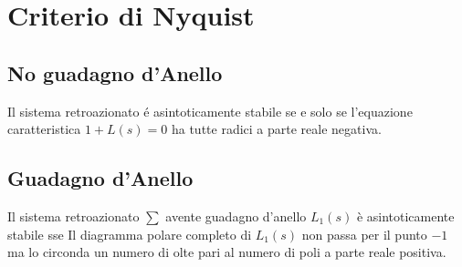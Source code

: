 \documentclass{article}
\begin{document}
    \section{Criterio di Nyquist}
    \subsection{No guadagno d'Anello}
    Il sistema retroazionato \'e asintoticamente stabile se e solo se l'equazione caratteristica $1+L(s) = 0$ ha tutte radici a parte reale negativa.

    \subsection{Guadagno d'Anello}
    Il sistema retroazionato $\sum$ avente guadagno d'anello $L_1(s)$ \`e asintoticamente stabile sse Il diagramma polare completo di $L_1(s)$ non passa per il punto $-1$ ma lo circonda un numero di olte pari al numero di poli a parte reale positiva.
\end{document}
